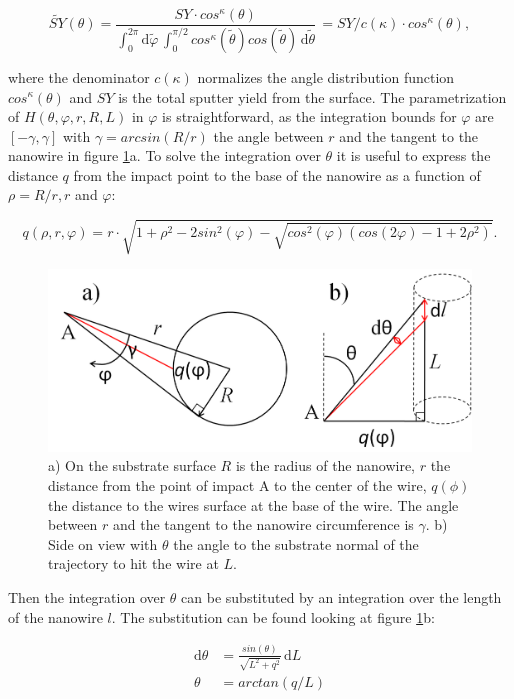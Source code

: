\begin{equation}
\tilde{SY}(\theta) = \frac{SY \cdot cos^\kappa(\theta)}{\int_0^{2\pi} \! \mathrm{d}\tilde\varphi \,\int_0^{\pi/2} \! cos^\kappa(\tilde\theta) cos(\tilde\theta)\,  \mathrm{d}\tilde\theta} \, = SY /c(\kappa) \cdot cos^\kappa(\theta) ,
\end{equation}

where the denominator $c(\kappa)$ normalizes the angle distribution function $cos^\kappa(\theta)$ and $SY$ is the total sputter yield from the surface. The parametrization of $H(\theta,\varphi,r,R,L)$ in $\varphi$ is straightforward, as the integration bounds for $\varphi$ are $[-\gamma, \gamma]$ with $\gamma = arcsin(R/r)$ the angle between $r$ and the tangent to the nanowire in figure \ref{anglesredepo}a. To solve the integration over $\theta$ it is useful to express the distance $q$ from the impact point to the base of the nanowire as a function of $\rho = R/r, r$ and $\varphi$:

\begin{equation}
q(\rho,r,\varphi) = r\cdot \sqrt{1 + \rho^2 - 2sin^2(\varphi) - \sqrt{cos^2(\varphi)(cos(2\varphi) - 1 + 2\rho^2)}}.
\end{equation}

\begin{figure}
	\centering
		\includegraphics[width=.6\textwidth]{images/anglesredeposition.jpg}
	\caption{a) On the substrate surface $R$ is the radius of the nanowire, $r$ the distance from the point of impact A to the center of the wire, $q(\phi)$ the distance to the wires surface at the base of the wire. The angle between $r$ and the tangent to the nanowire circumference is $\gamma$. b) Side on view with $\theta$ the angle to the substrate normal of the trajectory to hit the wire at $L$.} 
	\label{anglesredepo}
\end{figure} 

Then the integration over $\theta$ can be substituted by an integration over the length of the nanowire $l$. The substitution can be found looking at figure \ref{anglesredepo}b:

\begin{align*}
\mathrm{d}\theta &= \frac{sin(\theta)}{\sqrt{L^2 + q^2}}\,\mathrm{d}L\\
\theta &= arctan(q/L)
\end{align*}

